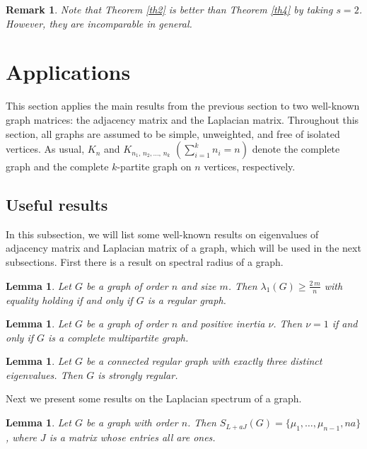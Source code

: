 \documentclass[12pt]{article}
\newtheorem{lemma}[theorem]{Lemma}
\newtheorem{remark}[theorem]{Remark}
\begin{document}
\begin{remark}
 Note that Theorem \ref{th2} is better than Theorem \ref{th4} by taking
 $s=2$. However, they are incomparable in general.
\end{remark}


\section{Applications}
This section applies the main results from the previous section to two well-known graph matrices: the adjacency matrix and the Laplacian matrix. Throughout this section, all graphs are assumed to be simple, unweighted, and free of isolated vertices. As usual, $K_n$ and $K_{n_1,\,n_2,\ldots,\,n_k}$ $(\sum_{i=1}^k n_i=n)$ denote the complete graph and the complete $k$-partite graph on $n$ vertices, respectively.

\subsection{Useful results}
In this subsection, we will list some well-known results on
eigenvalues of adjacency matrix and Laplacian matrix of a graph,
which will be used in the next subsections. First there is a result
on spectral radius of a graph.

 \begin{lemma} \label{le1} {\rm \cite{CS}} Let $G$ be a graph of order $n$ and size $m$.
 Then $\lambda_1(G)\geq \frac{2\,m}{n}$ with equality holding if and
 only if $G$ is a regular graph.
 \end{lemma}

  \begin{lemma} \label{le2} {\rm \cite{P}} Let $G$ be a graph of order $n$ and positive inertia $\nu$.
 Then $\nu=1$  if and only if $G$ is a complete multipartite graph.
 \end{lemma}


  \begin{lemma} \label{cor5} {\rm \cite{B}}
    Let $G$ be a connected regular graph with exactly three distinct eigenvalues. Then $G$ is strongly regular.
  \end{lemma}

Next we present some results on the Laplacian spectrum of a graph.
  \begin{lemma} \label{cor3}  {\rm \cite{B}}
    Let $G$ be a graph with order $n$.
    Then $S_{L+aJ}(G)=\{\mu_1,\dots,\mu_{n-1},na\}$, where $J$ is a
    matrix whose entries all are ones.
  \end{lemma}
\end{document}
